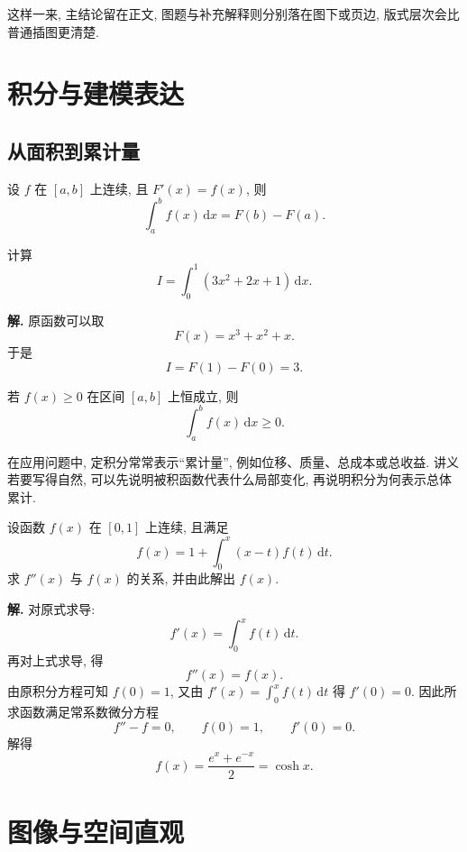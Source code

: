 \documentclass[a4paper,12pt,oneside]{maki-notes}
\begin{document}

这样一来, 主结论留在正文, 图题与补充解释则分别落在图下或页边, 版式层次会比普通插图更清楚.

\chapter{积分与建模表达}

\section{从面积到累计量}

\begin{axiom}
设 $f$ 在 $[a,b]$ 上连续, 且 $F'(x)=f(x)$, 则
\[
\int_a^b f(x)\,\mathrm{d}x = F(b)-F(a).
\]
\end{axiom}

\begin{example}
计算
\[
I=\int_0^1 (3x^2+2x+1)\,\mathrm{d}x.
\]
\end{example}

\textbf{解.} 原函数可以取
\[
F(x)=x^3+x^2+x.
\]
于是
\[
I=F(1)-F(0)=3.
\]

\begin{proposition}
若 $f(x)\ge 0$ 在区间 $[a,b]$ 上恒成立, 则
\[
\int_a^b f(x)\,\mathrm{d}x \ge 0.
\]
\end{proposition}

\begin{note}
在应用问题中, 定积分常常表示“累计量”, 例如位移、质量、总成本或总收益. 讲义若要写得自然, 可以先说明被积函数代表什么局部变化, 再说明积分为何表示总体累计.
\end{note}

\begin{longrealexam}[2023 真题改编]
设函数 $f(x)$ 在 $[0,1]$ 上连续, 且满足
\[
f(x)=1+\int_0^x (x-t)f(t)\,\mathrm{d}t.
\]
求 $f''(x)$ 与 $f(x)$ 的关系, 并由此解出 $f(x)$.

\tcblower

\textbf{解.} 对原式求导:
\[
f'(x)=\int_0^x f(t)\,\mathrm{d}t.
\]
再对上式求导, 得
\[
f''(x)=f(x).
\]
由原积分方程可知 $f(0)=1$, 又由 $f'(x)=\int_0^x f(t)\,\mathrm{d}t$ 得 $f'(0)=0$. 因此所求函数满足常系数微分方程
\[
f''-f=0,\qquad f(0)=1,\qquad f'(0)=0.
\]
解得
\[
f(x)=\dfrac{e^x+e^{-x}}{2}=\cosh x.
\]
\end{longrealexam}

\chapter{图像与空间直观}
\end{document}
